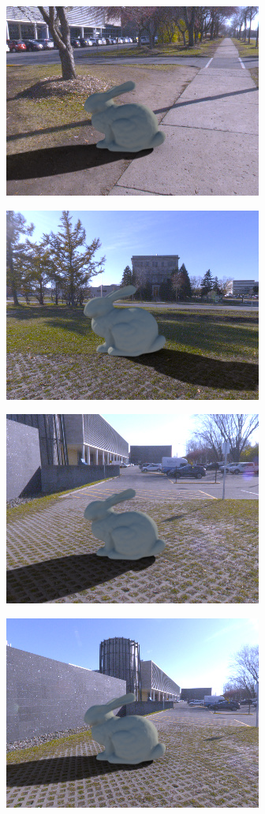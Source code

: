 \begin{minipage}{\linewidth}
\begin{multicols}{4}
\includegraphics[width=\mywidth]{AG8A2875_Panorama_hdr-corrected.jpg}

\includegraphics[width=\mywidth]{AG8A2917_Panorama_hdr-corrected_011.jpg}

\includegraphics[width=\mywidth]{AG8A2917_Panorama_hdr-corrected_016.jpg}

\includegraphics[width=\mywidth]{AG8A2917_Panorama_hdr-corrected_006.jpg}


\end{multicols}
\end{minipage}
